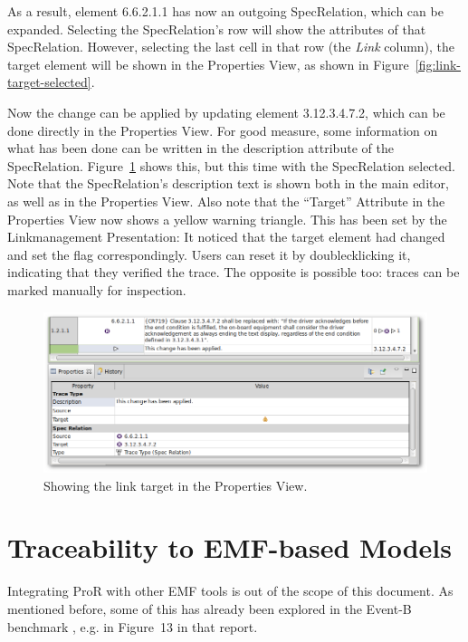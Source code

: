 \documentclass{template/openetcs_report}
\begin{document}
As a result, element 6.6.2.1.1 has now an outgoing SpecRelation, which can be expanded.  Selecting the SpecRelation's row will show the attributes of that SpecRelation.  However, selecting the last cell in that row (the \emph{Link} column), the target element will be shown in the Properties View, as shown in Figure~\ref{fig:link-target-selected}.

Now the change can be applied by updating element 3.12.3.4.7.2, which can be done directly in the Properties View.  For good measure, some information on what has been done can be written in the description attribute of the SpecRelation.  Figure~\ref{fig:link-target-changed} shows this, but this time with the SpecRelation selected.  Note that the SpecRelation's description text is shown both in the main editor, as well as in the Properties View.  Also note that the ``Target'' Attribute in the Properties View now shows a yellow warning triangle.  This has been set by the Linkmanagement Presentation: It noticed that the target element had changed and set the flag correspondingly.  Users can reset it by doublecklicking it, indicating that they verified the trace.  The opposite is possible too: traces can be marked manually for inspection.

\begin{figure}
	\begin{center}
	\includegraphics[width=\textwidth]{img/link-target-changed.png}
	\end{center}
	\caption{Showing the link target in the Properties View.}
	\label{fig:link-target-changed}
\end{figure} 

\section{Traceability to EMF-based Models}

Integrating ProR with other EMF tools is out of the scope of this document.  As mentioned before, some of this has already been explored in the Event-B benchmark \cite{event_b_benchmark}, e.g. in Figure~13 in that report.
\end{document}
